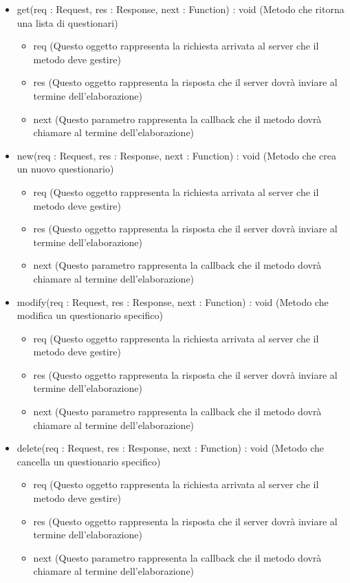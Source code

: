 \begin{description}
\begin{itemize}
\item get(req : Request, res : Response, next : Function) : void (Metodo che ritorna una lista di questionari)\begin{itemize}
\item req (Questo oggetto rappresenta la richiesta arrivata al server che il metodo deve gestire)
\item res (Questo oggetto rappresenta la risposta che il server dovrà inviare al termine dell'elaborazione)
\item next (Questo parametro rappresenta la callback che il metodo dovrà chiamare al termine dell’elaborazione)
\end{itemize}

\item new(req : Request, res : Response, next : Function) : void (Metodo che crea un nuovo questionario)\begin{itemize}
\item req (Questo oggetto rappresenta la richiesta arrivata al server che il metodo deve gestire)
\item res (Questo oggetto rappresenta la risposta che il server dovrà inviare al termine dell'elaborazione)
\item next (Questo parametro rappresenta la callback che il metodo dovrà chiamare al termine dell’elaborazione)
\end{itemize}

\item modify(req : Request, res : Response, next : Function) : void (Metodo che modifica un questionario specifico)\begin{itemize}
\item req (Questo oggetto rappresenta la richiesta arrivata al server che il metodo deve gestire)
\item res (Questo oggetto rappresenta la risposta che il server dovrà inviare al termine dell'elaborazione)
\item next (Questo parametro rappresenta la callback che il metodo dovrà chiamare al termine dell’elaborazione)
\end{itemize}

\item delete(req : Request, res : Response, next : Function) : void (Metodo che cancella un questionario specifico)\begin{itemize}
\item req (Questo oggetto rappresenta la richiesta arrivata al server che il metodo deve gestire)
\item res (Questo oggetto rappresenta la risposta che il server dovrà inviare al termine dell'elaborazione)
\item next (Questo parametro rappresenta la callback che il metodo dovrà chiamare al termine dell’elaborazione)
\end{itemize}

\end{itemize}

\end{description}

